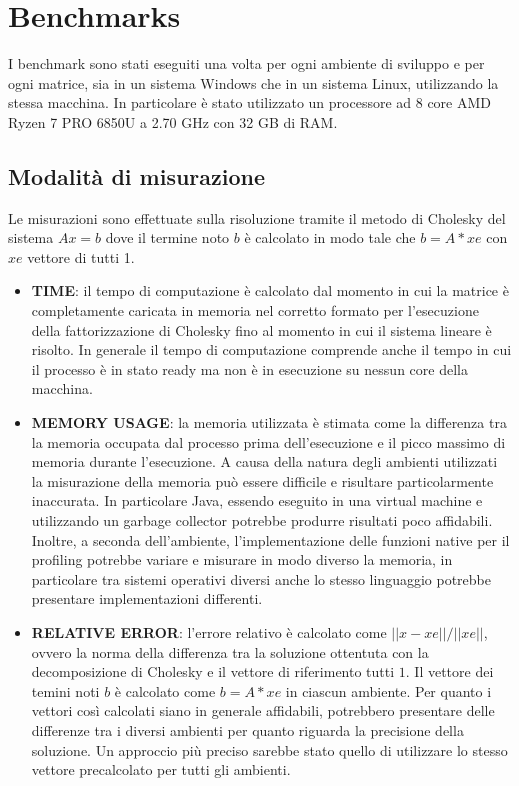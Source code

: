 \documentclass[a4paper, 12pt]{article}
\begin{document}
\section{Benchmarks}
I benchmark sono stati eseguiti una volta per ogni ambiente di sviluppo e per
ogni matrice, sia in un sistema Windows che in un sistema Linux, utilizzando la
stessa macchina. In particolare è stato utilizzato un processore ad 8 core AMD
Ryzen 7 PRO 6850U a 2.70 GHz con 32 GB di RAM.

\subsection{Modalità di misurazione}
Le misurazioni sono effettuate sulla risoluzione tramite il metodo di Cholesky
del sistema $Ax = b$ dove il termine noto $b$ è calcolato in modo tale che
$b = A*xe$ con $xe$ vettore di tutti 1.

\begin{itemize}
  \item \textbf{TIME}: il tempo di computazione è calcolato dal momento in cui
  la matrice è completamente caricata in memoria nel corretto formato per
  l'esecuzione della fattorizzazione di Cholesky fino al momento in cui il
  sistema lineare è risolto. In generale il tempo di computazione comprende
  anche il tempo in cui il processo è in stato ready ma non è in esecuzione su
  nessun core della macchina.
  \item \textbf{MEMORY USAGE}: la memoria utilizzata è stimata come la
  differenza tra la memoria occupata dal processo prima dell'esecuzione e il
  picco massimo di memoria durante l'esecuzione.
  A causa della natura degli ambienti utilizzati la misurazione della memoria
  può essere difficile e risultare particolarmente inaccurata.
  In particolare Java, essendo eseguito in una virtual machine e utilizzando un
  garbage collector potrebbe produrre risultati poco affidabili.\\
  Inoltre, a seconda dell'ambiente, l'implementazione delle funzioni native per
  il profiling potrebbe variare e misurare in modo diverso la memoria, in
  particolare tra sistemi operativi diversi anche lo stesso linguaggio potrebbe
  presentare implementazioni differenti.
  \item \textbf{RELATIVE ERROR}: l'errore relativo è calcolato come
  $||x-xe||/||xe||$, ovvero la norma della differenza tra la soluzione ottentuta
  con la decomposizione di Cholesky e il vettore di riferimento tutti $1$.
  Il vettore dei temini noti $b$ è calcolato come $b = A*xe$ in ciascun
  ambiente. Per quanto i vettori così calcolati siano in generale affidabili,
  potrebbero presentare delle differenze tra i diversi ambienti per quanto
  riguarda la precisione della soluzione. Un approccio più preciso sarebbe stato
  quello di utilizzare lo stesso vettore precalcolato per tutti gli ambienti.
\end{itemize}
\end{document}
